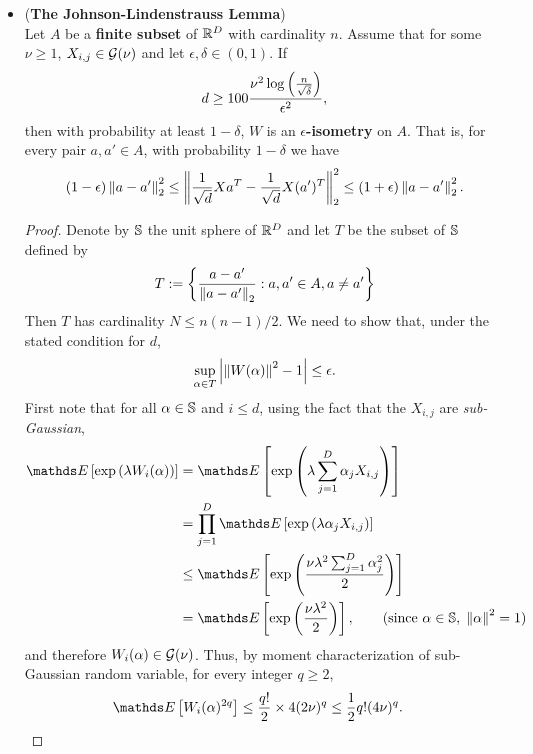 \documentclass[11pt]{article}
\begin{document}
\begin{itemize}
\item \begin{theorem} (\textbf{The Johnson-Lindenstrauss Lemma}) \citep{boucheron2013concentration} \\
Let $A$ be a \textbf{finite subset} of ${\mathbb R}^D$ with cardinality $n$. Assume that for some $\nu \ge 1$,  $X_{i,j} \in {\mathcal G}(\nu)$ and let $\epsilon, \delta \in (0, 1)$. If
\begin{align*}
d \ge 100 \frac{\nu^2  \log \left(\frac{n}{\sqrt{\delta}}\right)}{\epsilon^2},
\end{align*} then with probability at least $1 - \delta$,  $W$ is an \textbf{$\epsilon$-isometry} on $A$. That is, for every pair $a, a' \in A$, with probability $1- \delta$ we have 
\begin{align*}
(1 - \epsilon)\left\|a - a'\right\|_{2}^2 \le \left\|\frac{1}{\sqrt{d}} Xa^{T} - \frac{1}{\sqrt{d}} X(a')^{T}\right\|_{2}^2 \le (1 + \epsilon)\left\|a - a'\right\|_{2}^2.
\end{align*}
\end{theorem}
\begin{proof}
Denote by ${\mathbb S}$ the unit sphere of ${\mathbb R}^D$ and let $T$ be the subset of ${\mathbb S}$ defined by
\begin{align*}
T := \left\{\frac{a - a'}{\left\|a - a'\right\|_{2}}:  a, a' \in A, a \neq a'\right\}
\end{align*} Then $T$ has cardinality $N \le n(n - 1)/2.$ We need to show that, under the stated condition for $d$,
\begin{align*}
\sup_{\alpha \in T}\left\lvert \left\|W(\alpha)\right\|_{}^2 - 1 \right\rvert \le \epsilon.
\end{align*} First note that for all $\alpha \in {\mathbb S}$ and $i \le d$, using the fact that the $X_{i,j}$ are \emph{sub-Gaussian},
\begin{align*}
\E{}{\exp\paren{\lambda W_i(\alpha)}} &= \E{}{\exp\paren{\lambda \sum_{j=1}^{D}\alpha_{j}X_{i,j} }}\\
&= \prod_{j=1}^D\E{}{\exp\paren{\lambda\alpha_j X_{i,j} }} \\
&\le  \E{}{\exp\paren{\frac{\nu\lambda^2\sum_{j=1}^{D}\alpha_j^{2}}{2}  }} \\
&= \E{}{\exp\paren{\frac{\nu\lambda^2}{2}  }}, \qquad (\text{since }\alpha \in \bS, \;\norm{\alpha}{}^2 =1)
\end{align*} and therefore $W_i(\alpha) \in {\mathcal G}(\nu)$. Thus, by moment characterization of sub-Gaussian random variable, for every integer $q \ge 2$,
\begin{align*}
\E{}{W_i(\alpha)^{2q}} &\le \frac{q!}{2}  \times 4(2\nu)^{q} \le \frac{1}{2}q! (4\nu)^q.

\end{align*}
\end{proof}
\end{itemize}
\end{document}
